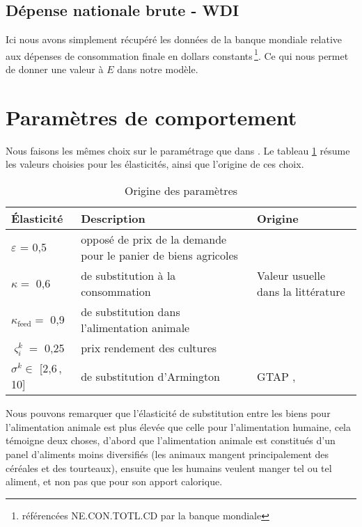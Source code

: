 \subsection{Dépense nationale brute - WDI}

Ici nous avons simplement récupéré les données de la banque mondiale relative aux dépenses de consommation finale en dollars constants\,\footnote{référencées NE.CON.TOTL.CD par la banque mondiale}. Ce qui nous permet de donner une valeur à $E$ dans notre modèle.


\section{Paramètres de comportement}
Nous faisons les mêmes choix sur le paramétrage que dans \cite{Gouel2025}. Le tableau \ref{tab:ela} résume les valeurs choisies pour les élasticités, ainsi que l'origine de ces choix.

\begin{table}[h]
    \centering
    \begin{tabularx}{\textwidth}{l >{\raggedright\arraybackslash}X >{\raggedright\arraybackslash}X}
        \textbf{Élasticité}        & \textbf{Description}                                           & \textbf{Origine}                                   \\ \hline
        $\varepsilon$ = 0,5        & opposé de prix de la demande pour le panier de biens agricoles & \cite{Comin2021}                                   \\
        $\kappa =$ 0,6             & de substitution à la consommation                              & Valeur usuelle dans la littérature \cite{Rude2000} \\
        $\kappa_\text{feed} =$ 0,9 & de substitution dans l'alimentation animale                    & \cite{Rude2000}                                    \\
        $\varsigma_i^k =$ 0,25     & prix rendement des cultures                                    & \cite{Keeney2009}                                  \\
        $\sigma^k \in$ [2,6\,, 10] & de substitution d'Armington                                    & GTAP  \cite{Aguiar2022}, \cite{Costinot2016}       \\
        \hline
    \end{tabularx}
    \caption{Origine des paramètres}
    \label{tab:ela}
\end{table}

Nous pouvons remarquer que l'élasticité de substitution entre les biens pour l'alimentation animale est plus élevée que celle pour l'alimentation humaine, cela témoigne deux choses, d'abord que l'alimentation animale est constitués d'un panel d'aliments moins diversifiés (les animaux mangent principalement des céréales et des tourteaux), ensuite que les humains veulent manger tel ou tel aliment, et non pas que pour son apport calorique.

